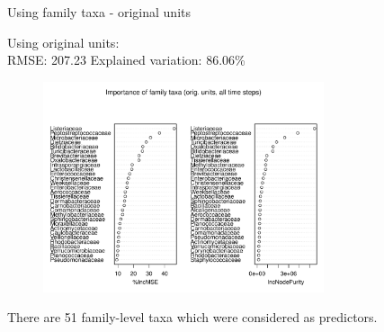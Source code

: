 \documentclass{beamer}
\begin{document}
\begin{frame}{Using family taxa - original units}

  {\scriptsize
    
  \noindent Using original units:\\
  RMSE: 207.23  \hspace{0.05in}  Explained variation: 86.06\%

  \begin{center}
    \begin{figure}
      \includegraphics[width=3.25in]{../only_families/all_time_steps/orig_units_all_data_families_imp_plot}
    \end{figure}
  \end{center}
  \vspace{-0.25in}

\noindent There are 51 family-level taxa which were considered as predictors.
}

\end{frame}
\end{document}
